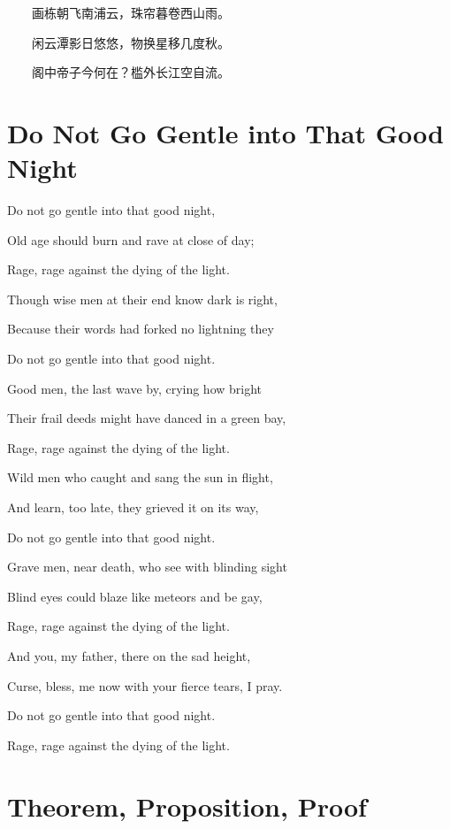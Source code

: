 \documentclass[fontset=none]{ctexart}
\begin{document}
　　画栋朝飞南浦云，珠帘暮卷西山雨。

　　闲云潭影日悠悠，物换星移几度秋。

　　阁中帝子今何在？槛外长江空自流。

\section{Do Not Go Gentle into That Good Night}

Do not go gentle into that good night,

Old age should burn and rave at close of day;

Rage, rage against the dying of the light.

Though wise men at their end know dark is right,

Because their words had forked no lightning they

Do not go gentle into that good night.

Good men, the last wave by, crying how bright

Their frail deeds might have danced in a green bay,

Rage, rage against the dying of the light.

Wild men who caught and sang the sun in flight,

And learn, too late, they grieved it on its way,

Do not go gentle into that good night.

Grave men, near death, who see with blinding sight

Blind eyes could blaze like meteors and be gay,   

Rage, rage against the dying of the light.

And you, my father, there on the sad height,

Curse, bless, me now with your fierce tears, I pray.

Do not go gentle into that good night.

Rage, rage against the dying of the light.

\section{Theorem, Proposition, Proof}
\end{document}
